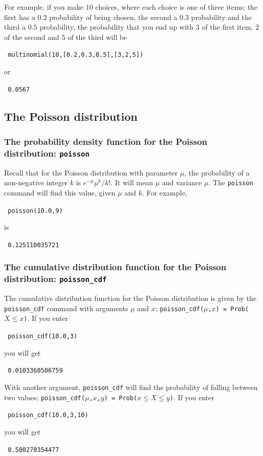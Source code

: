 \documentclass[a4paper,11pt]{book}
\begin{document}
For example, if you make $10$ choices, where each choice is one of
three items; the first has a $0.2$ probability of being chosen, the
second a $0.3$ probability and the third a $0.5$ probability, the
probability that you end up with $3$ of the first item, $2$ of the
second and $5$ of the third will be
\begin{center}
  \tt
  multinomial(10,[0.2,0.3,0.5],[3,2,5])
\end{center}
or
\begin{center}
  \tt
  0.0567
\end{center}

\subsection{The Poisson distribution}
\subsubsection{The probability density function for the Poisson
distribution: \texttt{poisson}}

Recall that for the Poisson distribution with parameter $\mu$, the
probability of a non-negative integer $k$ is $e^{-\mu}\mu^k/k!$.  It
will mean $\mu$ and variance $\mu$.  The \texttt{poisson} command will
find this value, given $\mu$ and $k$.  For example,
\begin{center}
  \tt
  poisson(10.0,9)
\end{center}
is
\begin{center}
  \tt
  0.125110035721
\end{center}

\subsubsection{The cumulative distribution function for the Poisson
distribution: \texttt{poisson\_cdf}}

The cumulative distribution function for the Poisson distribution is
given by the \texttt{poisson\_cdf} command with arguments $\mu$ and
$x$; \texttt{poisson\_cdf($\mu$,$x$) = Prob($X \le x$)}.  If you enter
\begin{center}
  \tt
  poisson\_cdf(10.0,3)
\end{center}
you will get
\begin{center}
  \tt
  0.0103360506759
\end{center}

With another argument, \texttt{poisson\_cdf} will find the probability
of falling between two values;
\texttt{poisson\_cdf($\mu$,$x$,$y$) = Prob($x \le X \le y$)}.
If you enter
\begin{center}
  \tt
  poisson\_cdf(10.0,3,10)
\end{center}
you will get
\begin{center}
  \tt
  0.580270354477
\end{center}
\end{document}
